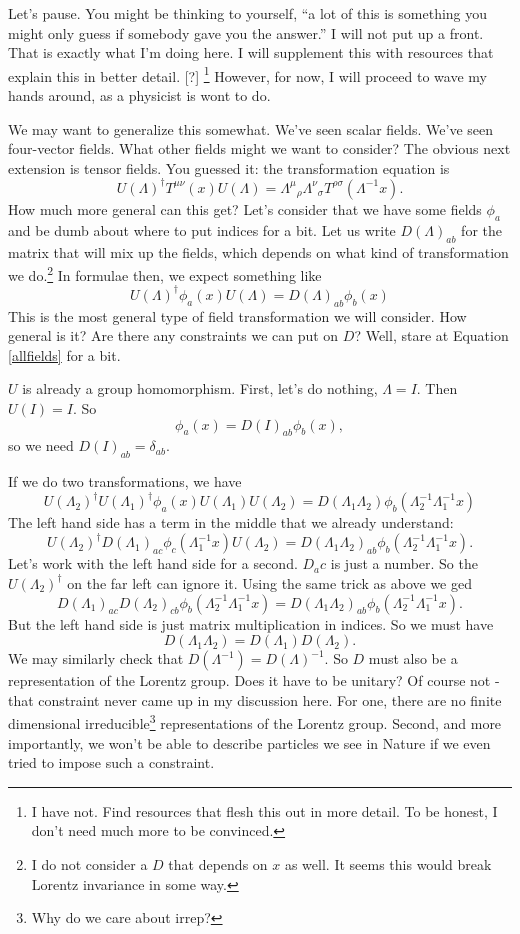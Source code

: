 \documentclass[main.tex]{subfiles}
\begin{document}
Let's pause. You might be thinking to yourself,  ``a lot of this is something you might only guess if somebody gave you the answer.'' I will not put up a front. That is exactly what I'm doing here. I will supplement this with resources that explain this in better detail. [?] \footnote{I have not. Find resources that flesh this out in more detail. To be honest, I don't need much more to be convinced.} However, for now, I will proceed to wave my hands around, as a physicist is wont to do.

We may want to generalize this somewhat. We've seen scalar fields. We've seen four-vector fields. What other fields might we want to consider? The obvious next extension is tensor fields. You guessed it: the transformation equation is
\[
U(\Lambda)^\dagger T^{\mu \nu} (x) U(\Lambda) = {\Lambda^\mu}_\rho {\Lambda^\nu}_\sigma T^{\rho \sigma} (\Lambda^{-1}x).
\]
How much more general can this get? Let's consider that we have some fields $\phi_a$ and be dumb about where to put indices for a bit. Let us write $D(\Lambda)_{ab}$ for the matrix that will mix up the fields, which depends on what kind of transformation we do.\footnote{I do not consider a $D$ that depends on $x$ as well. It seems this would break Lorentz invariance in some way.} In formulae then, we expect something like
\begin{equation} \label{allfields}
\boxed{U(\Lambda)^\dagger \phi_a (x) U(\Lambda) = D(\Lambda)_{ab} \phi_b (x)}
\end{equation}
This is the most general type of field transformation we will consider. How general is it? Are there any constraints we can put on $D$? Well, stare at Equation \ref{allfields} for a bit. 

$U$ is already a group homomorphism. First, let's do nothing, $\Lambda = I$. Then $U(I) = I$. So
\[
\phi_a (x) = D(I)_{ab} \phi_b (x),
\]
so we need $D(I)_{ab} = \delta_{ab}$.

If we do two transformations, we have
\[
U(\Lambda_2)^\dagger U(\Lambda_1)^\dagger \phi_a (x) U(\Lambda_1) U(\Lambda_2) = D(\Lambda_1 \Lambda_2) \phi_b (\Lambda_2^{-1} \Lambda_1^{-1}x)
\]
The left hand side has a term in the middle that we already understand:
\[
U(\Lambda_2)^\dagger D(\Lambda_1)_{ac} \phi_c(\Lambda_1^{-1} x) U(\Lambda_2) = D(\Lambda_1 \Lambda_2)_{ab} \phi_b (\Lambda_2^{-1} \Lambda_1^{-1} x).
\]
Let's work with the left hand side for a second. $D_ac$ is just a number. So the $U(\Lambda_2)^\dagger$ on the far left can ignore it. Using the same trick as above we ged
\[
D(\Lambda_1)_{ac} D(\Lambda_2)_{cb} \phi_b (\Lambda_2^{-1} \Lambda_1^{-1} x) = D(\Lambda_1 \Lambda_2)_{ab} \phi_b (\Lambda_2^{-1} \Lambda_1^{-1} x).
\]
But the left hand side is just matrix multiplication in indices. So we must have
\[
D (\Lambda_1 \Lambda_2) = D(\Lambda_1) D(\Lambda_2).
\]
We may similarly check that $D(\Lambda^{-1}) = D(\Lambda)^{-1}$. So $D$ must also be a representation of the Lorentz group. Does it have to be unitary? Of course not - that constraint never came up in my discussion here. For one, there are no finite dimensional irreducible\footnote{Why do we care about irrep?} representations of the Lorentz group. Second, and more importantly, we won't be able to describe particles we see in Nature if we even tried to impose such a constraint.
\end{document}
